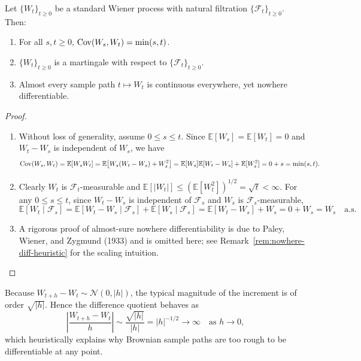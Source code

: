 \begin{proposition}
\label{prop:wiener-basic}
Let $\{W_t\}_{t \ge 0}$ be a standard Wiener process with natural filtration $\{\mathcal{F}_t\}_{t \ge 0}$. Then:
\begin{enumerate}
    \item For all $s, t \ge 0$, $\operatorname{Cov}(W_s, W_t) = \min(s, t)$.
    \item $\{W_t\}_{t \ge 0}$ is a martingale with respect to $\{\mathcal{F}_t\}_{t \ge 0}$.
    \item Almost every sample path $t \mapsto W_t$ is continuous everywhere, yet nowhere differentiable.
\end{enumerate}
\end{proposition}
\begin{proof}
\begin{enumerate}
    \item Without loss of generality, assume $0 \le s \le t$. Since $\mathbb{E}[W_s] = \mathbb{E}[W_t] = 0$ and $W_t - W_s$ is independent of $W_s$, we have
    \[
    \operatorname{Cov}(W_s, W_t) = \mathbb{E}[W_s W_t] = \mathbb{E}\big[W_s(W_t - W_s) + W_s^2\big] = \mathbb{E}[W_s]\mathbb{E}[W_t - W_s] + \mathbb{E}[W_s^2] = 0 + s = \min(s, t).
    \]
    \item Clearly $W_t$ is $\mathcal{F}_t$-measurable and $\mathbb{E}[|W_t|] \le (\mathbb{E}[W_t^2])^{1/2} = \sqrt{t} < \infty$. For any $0 \le s \le t$, since $W_t - W_s$ is independent of $\mathcal{F}_s$ and $W_s$ is $\mathcal{F}_s$-measurable,
    \[
    \mathbb{E}[W_t \mid \mathcal{F}_s] = \mathbb{E}[W_t - W_s \mid \mathcal{F}_s] + \mathbb{E}[W_s \mid \mathcal{F}_s] = \mathbb{E}[W_t - W_s] + W_s = 0 + W_s = W_s \quad \text{a.s.}
    \]
    \item A rigorous proof of almost-sure nowhere differentiability is due to Paley, Wiener, and Zygmund (1933) and is omitted here; see Remark~\ref{rem:nowhere-diff-heuristic} for the scaling intuition. \qedhere
\end{enumerate}
\end{proof}

\begin{remark}
\label{rem:nowhere-diff-heuristic}
Because $W_{t+h} - W_t \sim \mathcal{N}(0, |h|)$, the typical magnitude of the increment is of order $\sqrt{|h|}$. Hence the difference quotient behaves as
\[
\left|\frac{W_{t+h} - W_t}{h}\right| \sim \frac{\sqrt{|h|}}{|h|} = |h|^{-1/2} \to \infty \quad \text{as } h \to 0,
\]
which heuristically explains why Brownian sample paths are too rough to be differentiable at any point.
\end{remark}

